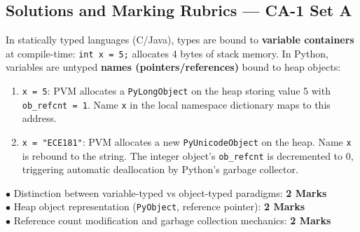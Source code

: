 
\newpage
\subsection*{Solutions and Marking Rubrics --- CA-1 Set A}

\begin{solutionbox}
In statically typed languages (C/Java), types are bound to \textbf{variable containers} at compile-time: \texttt{int x = 5;} allocates 4 bytes of stack memory. In Python, variables are untyped \textbf{names (pointers/references)} bound to heap objects:
\begin{enumerate}[leftmargin=1.5em]
    \item \texttt{x = 5}: PVM allocates a \texttt{PyLongObject} on the heap storing value 5 with \texttt{ob\_refcnt = 1}. Name \texttt{x} in the local namespace dictionary maps to this address.
    \item \texttt{x = "ECE181"}: PVM allocates a new \texttt{PyUnicodeObject} on the heap. Name \texttt{x} is rebound to the string. The integer object's \texttt{ob\_refcnt} is decremented to 0, triggering automatic deallocation by Python's garbage collector.
\end{enumerate}
\begin{markingrubric}
$\bullet$ Distinction between variable-typed vs object-typed paradigms: \textbf{2 Marks}\\
$\bullet$ Heap object representation (\texttt{PyObject}, reference pointer): \textbf{2 Marks}\\
$\bullet$ Reference count modification and garbage collection mechanics: \textbf{2 Marks}
\end{markingrubric}
\end{solutionbox}

